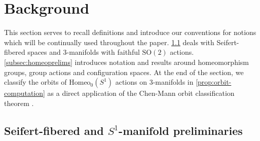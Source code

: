 \documentclass[10pt, oneside]{article}
\newcommand{\SO}[1][2]{\text{SO}(#1)}
\newcommand{\homeo}[1][S^1]{\text{Homeo}_0(#1)}
\newcommand{\conf}[2][S^1]{\text{Conf}_{#2}(#1)}
\newcommand{\dimn}[1]{\text{dim}(#1)}
\theoremstyle{definition}
\theoremstyle{definition}
\begin{document}



\section{Background}\label{sec:background}
This section serves to recall definitions and introduce our conventions for notions which will be continually used throughout the paper. \cref{subsec:seifprelims} deals with Seifert-fibered spaces and 3-manifolds with faithful $\SO$ actions. \cref{subsec:homeoprelims} introduces notation and results around homeomorphism groups, group actions and configuration spaces. At the end of the section, we classify the orbits of $\homeo$ actions on 3-manifolds in \cref{prop:orbit-computation} as a direct application of the Chen-Mann orbit classification theorem \cite{chen:StructureTheorems}.

\subsection{Seifert-fibered and \texorpdfstring{$S^1$}{S\^string 1}-manifold preliminaries}\label{subsec:seifprelims}
\end{document}
